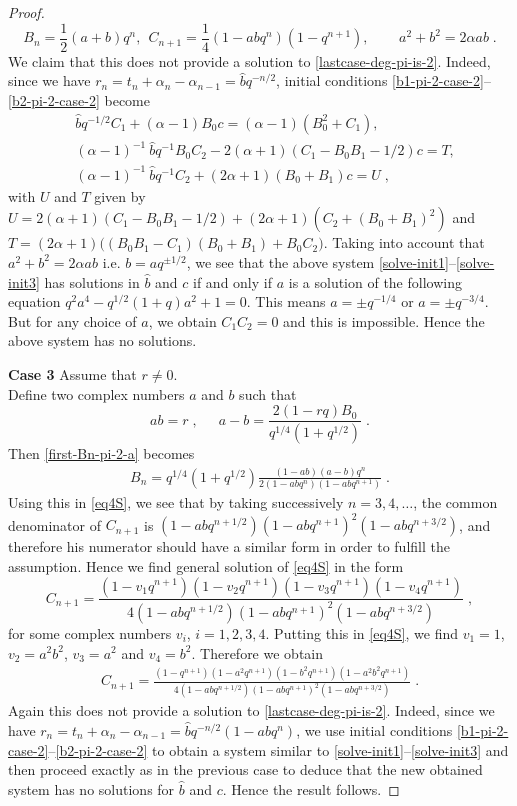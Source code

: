\documentclass{amsart}
\theoremstyle{remark}
\numberwithin{equation}{section}
\begin{document}
\begin{proof}
$$B_n=\frac{1}{2}(a+b)q^n,~~C_{n+1}=\frac{1}{4}(1-abq^n)(1-q^{n+1}),~~~~\quad~ a^2+b^2=2\alpha ab\;.$$
We claim that this does not provide a solution to \eqref{lastcase-deg-pi-is-2}. Indeed, since we have $r_n=t_n+\alpha_n-\alpha_{n-1}=\widehat{b}q^{-n/2}$, initial conditions \eqref{b1-pi-2-case-2}--\eqref{b2-pi-2-case-2} become
\begin{align}
&\widehat{b}q^{-1/2}C_1 +(\alpha-1)B_0c=(\alpha-1)(B_0 ^2 +C_1),\label{solve-init1}\\
&(\alpha-1)^{-1}~\widehat{b}q^{-1}B_0C_2 -2(\alpha+1)(C_1-B_0B_1-1/2)c= T,\\
&(\alpha-1)^{-1}~\widehat{b}q^{-1}C_2 +(2\alpha+1)(B_0+B_1)c =U\;,\label{solve-init3}
\end{align}
with $U$ and $T$ given by $U=2(\alpha+1)(C_1-B_0B_1-1/2)+(2\alpha+1)(C_2+(B_0+B_1)^2)$ and $T=(2\alpha+1)\Big((B_0B_1-C_1)(B_0+B_1) +B_0C_2\Big)$. Taking into account that $a^2+b^2=2\alpha ab$ i.e. $b=aq^{\pm 1/2}$, we see that the above system \eqref{solve-init1}--\eqref{solve-init3} has solutions in $\widehat{b}$ and $c$ if and only if $a$ is a solution of the following equation $q^2a^4-q^{1/2}(1+q)a^2+1=0$. This means $a=\pm q^{-1/4}$ or $a=\pm q^{-3/4}$. But for any choice of $a$, we obtain $C_1C_2=0$ and this is impossible. Hence the above system has no solutions.




\textbf{Case 3} Assume that $r\neq 0$.\\
Define two complex numbers $a$ and $b$ such that 
$$ab=r \;, ~~\quad  a-b=\frac{2(1-rq)B_0}{q^{1/4}(1+q^{1/2})}\;.$$
Then \eqref{first-Bn-pi-2-a} becomes
\begin{align*}
B_n=q^{1/4}(1+q^{1/2})\frac{(1-ab)(a-b)q^n}{2(1-abq^n)(1-abq^{n+1})}\;.
\end{align*}
Using this in \eqref{eq4S}, we see that by taking successively $n=3,4,\ldots$, the common denominator of $C_{n+1}$ is $(1-abq^{n+1/2})(1-abq^{n+1})^2(1-abq^{n+3/2})$, and therefore his numerator should have a similar form in order to fulfill the assumption.
Hence we find general solution of \eqref{eq4S} in the form
$$C_{n+1}=\frac{(1-v_1q^{n+1})(1-v_2q^{n+1})(1-v_3q^{n+1})(1-v_4q^{n+1})}{4(1-abq^{n+1/2})(1-abq^{n+1})^2(1-abq^{n+3/2})}\;,$$
for some complex numbers $v_i$, $i=1,2,3,4$. Putting this in \eqref{eq4S}, we find $v_1=1$, $v_2=a^2b^2$, $v_3=a^2$ and $v_4=b^2$. Therefore we obtain
\begin{align*}
C_{n+1}=\frac{(1-q^{n+1})(1-a^2q^{n+1})(1-b^2q^{n+1})(1-a^2b^2q^{n+1})}{4(1-abq^{n+1/2})(1-abq^{n+1})^2(1-abq^{n+3/2})}\;.
\end{align*}
Again this does not provide a solution to \eqref{lastcase-deg-pi-is-2}. Indeed, since we have $r_n=t_n+\alpha_n-\alpha_{n-1}=\widehat{b}q^{-n/2}(1-abq^n)$, we use initial conditions \eqref{b1-pi-2-case-2}--\eqref{b2-pi-2-case-2} to obtain a system similar to \eqref{solve-init1}--\eqref{solve-init3} and then proceed exactly as in the previous case to deduce that the new obtained system has no solutions for $\widehat{b}$ and $c$. Hence the result follows.
\end{proof}
\end{document}
